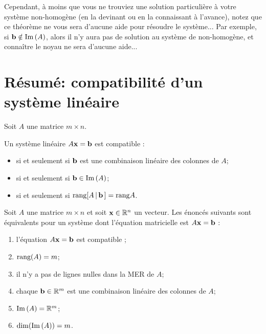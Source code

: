 \begin{remark}Cependant, à moins que vous ne trouviez une solution particulière  à votre système non-homogène (en la devinant ou en la connaissant à l'avance),
notez que ce théorème ne vous sera d'aucune aide pour résoudre le système...  Par exemple, si $\mathbf{b} \notin \operatorname{Im}\,(A)$, alors
il n'y aura pas de solution au système de non-homogène, et connaître le noyau ne sera d'aucune aide...
\end{remark}

\section{Résumé: compatibilité d'un système linéaire}\label{consistency}
Soit $A$ une matrice $m\times n$.

Un système linéaire $A\mathbf{x} = \mathbf{b}$ est compatible :
\begin{itemize}
\item  si et seulement si $\mathbf{b}$ est une combinaison linéaire des colonnes de $A$;
\item si et seulement si $\mathbf{b} \in \operatorname{Im}\,(A)$;
\item si et seulement si $\textrm{rang} [ A\, |\,\mathbf{b}\,]=\textrm{rang} A$.
\end{itemize}

\begin{theorem} Soit $A$ une matrice $m\times n$ et soit $\mathbf{x}\in \mathbb{R}^n$ un vecteur.  Les \'enonc\'es suivants sont équivalents pour un système dont l'équation matricielle est $A\mathbf{x}=\mathbf{b}$ :

\begin{enumerate}[(1)]
\item l'équation $A\mathbf{x} = \mathbf{b}$ est compatible ;
\item $\textrm{rang}(A) = m$;  
\item il n'y a pas de lignes nulles dans la MER de $A$; 
\item chaque $\mathbf{b} \in \mathbb{R}^m$ est une combinaison linéaire des colonnes de $A$;  
\item $\operatorname{Im}\,(A) = \mathbb{R}^m$;  
\item $\dim(\operatorname{Im}\,(A)) = m$.  
 
\end{enumerate}
\end{theorem}

